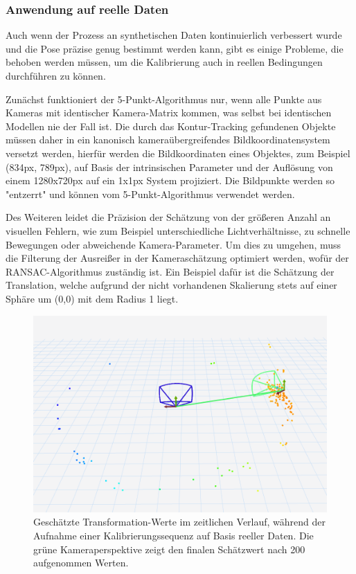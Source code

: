 \documentclass[12pt, ngerman]{article}
\begin{document}
\subsubsection{Anwendung auf reelle Daten}
Auch wenn der Prozess an synthetischen Daten kontinuierlich verbessert wurde und die Pose präzise genug bestimmt werden kann, gibt es einige Probleme, die behoben werden müssen, um die Kalibrierung auch in reellen Bedingungen durchführen zu können. 

Zunächst funktioniert der 5-Punkt-Algorithmus nur, wenn alle Punkte aus Kameras mit identischer Kamera-Matrix kommen, was selbst bei identischen Modellen nie der Fall ist. Die durch das Kontur-Tracking gefundenen Objekte müssen daher in ein kanonisch kameraübergreifendes Bildkoordinatensystem versetzt werden, hierfür werden die Bildkoordinaten eines Objektes, zum Beispiel (834px, 789px), auf Basis der intrinsischen Parameter und der Auflösung von einem 1280x720px auf ein 1x1px System projiziert. Die Bildpunkte werden so "entzerrt" und können vom 5-Punkt-Algorithmus verwendet werden.

Des Weiteren leidet die Präzision der Schätzung von der größeren Anzahl an visuellen Fehlern, wie zum Beispiel unterschiedliche Lichtverhältnisse, zu schnelle Bewegungen oder abweichende Kamera-Parameter. Um dies zu umgehen, muss die Filterung der Ausreißer in der Kameraschätzung optimiert werden, wofür der RANSAC-Algorithmus zuständig ist. Ein Beispiel dafür ist die Schätzung der Translation, welche aufgrund der nicht vorhandenen Skalierung stets auf einer Sphäre um (0,0) mit dem Radius 1 liegt. 

\vspace{5pt}
\begin{figure}[hbtp!]
    \includegraphics[width=\textwidth]{pointcloud_no_filter.png}
    \caption{Geschätzte Transformation-Werte im zeitlichen Verlauf, während der Aufnahme einer Kalibrierungssequenz auf Basis reeller Daten. Die grüne Kameraperspektive zeigt den finalen Schätzwert nach 200 aufgenommen Werten.}
    \label{Abb: pointcloud_no_filter}
\end{figure}
\end{document}
